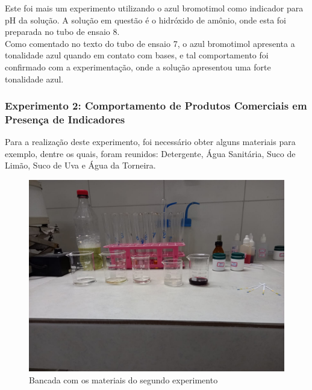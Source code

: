     	\indent Este foi mais um experimento utilizando o azul bromotimol como indicador para pH da solução. A solução em questão é o hidróxido de amônio, onde esta foi preparada no tubo de ensaio 8. \\
    	
    	\indent Como comentado no texto do tubo de ensaio 7, o azul bromotimol apresenta a tonalidade azul quando em contato com bases, e tal comportamento foi confirmado com a experimentação, onde a solução apresentou uma forte tonalidade azul.

        \newpage
        
        \subsubsection{Experimento 2: Comportamento de Produtos Comerciais em Presença de Indicadores}\label{subsubsec:mat_metodos_exp2}
        \indent Para a realização deste experimento, foi necessário obter alguns materiais para exemplo, dentre os quais, foram reunidos: Detergente, Água Sanitária, Suco de Limão, Suco de Uva e Água da Torneira.
        
        \begin{figure}[h]
        	\centering
        	\includegraphics[scale=0.25]{pictures/bancada.jpeg}
        	\caption{Bancada com os materiais do segundo experimento}
        	\label{fig: Bancada do segundo experimento}
        \end{figure}
        
        
        \newpage

